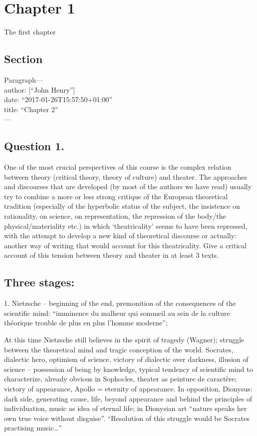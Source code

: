 \documentclass[oneside]{memoir}
\let\oldsection\section
\renewcommand\section{\clearpage\gdef\znewpage{\global\let\znewpage\clearpage}\oldsection}
\begin{document}
\chapter{Chapter 1}\label{chapter-1}

The first chapter

\section{Section}\label{section}

Paragraph---\\
author: {[}``John Henry''{]}\\
date: ``2017-01-26T15:57:50+01:00''\\
title: ``Chapter 2''\\
---

\section{Question 1.}\label{question-1.}

One of the most crucial perspectives of this course is the complex
relation between theory (critical theory, theory of culture) and
theater. The approaches and discourses that are developed (by most of
the authors we have read) usually try to combine a more or less strong
critique of the European theoretical tradition (especially of the
hyperbolic status of the subject, the insistence on rationality, on
science, on representation, the repression of the body/the
physical/materiality etc.) in which `theatricality' seems to have been
repressed, with the attempt to develop a new kind of theoretical
discourse or actually: another way of writing that would account for
this theatricality. Give a critical account of this tension between
theory and theater in at least 3 texts.

\section{Three stages:}\label{three-stages}

1. Nietzsche -- beginning of the end, premonition of the consequences of
the scientific mind: ``imminence du malheur qui sommeil au sein de la
culture théorique trouble de plus en plus l'homme moderne'';

At this time Nietzsche still believes in the spirit of tragedy (Wagner);
struggle between the theoretical mind and tragic conception of the
world. Socrates, dialectic hero, optimism of science, victory of
dialectic over darkness, illusion of science -- possession of being by
knowledge, typical tendency of scientific mind to characterize, already
obvious in Sophocles, theater as peinture de caractère; victory of
appearance, Apollo = eternity of appearance. In opposition, Dionysus:
dark side, generating cause, life, beyond appearance and behind the
principles of individuation, music as idea of eternal life; in Dionysian
art ``nature speaks her own true voice without disguise''. ``Resolution
of this struggle would be Socrates practising music\ldots{}''
\end{document}
